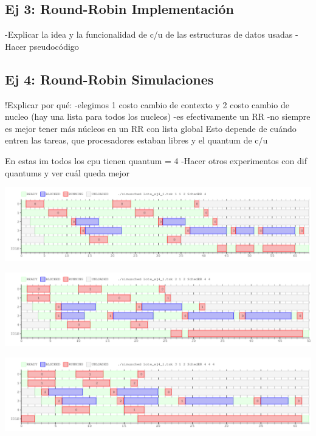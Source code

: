 \subsection{Ej 3: Round-Robin Implementación}
-Explicar la idea y la funcionalidad de c/u de las
estructuras de datos usadas
-Hacer pseudocódigo

\subsection{Ej 4: Round-Robin Simulaciones}

!Explicar por qué: 
-elegimos 1 costo cambio de contexto y 2 costo cambio de nucleo (hay una lista para todos los nucleos)
-es efectivamente un RR
-no siempre es mejor tener más núcleos en un RR con lista global
Esto depende de cuándo entren las tareas, que procesadores
estaban libres y el quantum de c/u

En estas im todos los cpu tienen quantum = 4
-Hacer otros experimentos con dif quantums y ver cuál queda mejor

\begin{center}
 \includegraphics[scale=0.5]{./ej3y4/ej4_1cpu.png}
\end{center}

\begin{center}
 \includegraphics[scale=0.5]{./ej3y4/ej4_2cpu.png}
\end{center}

\begin{center}
 \includegraphics[scale=0.5]{./ej3y4/ej4_3cpu.png}
\end{center}


